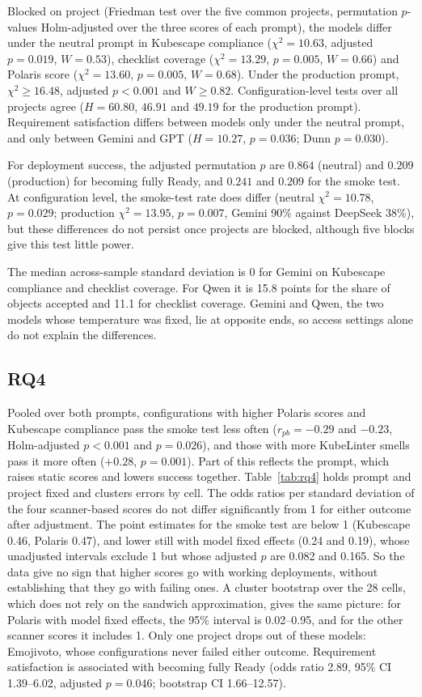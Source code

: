 Blocked on project (Friedman test over the five common projects, permutation $p$-values Holm-adjusted over the three scores of each prompt), the models differ under the neutral prompt in Kubescape compliance ($\chi^2=10.63$, adjusted $p=0.019$, $W=0.53$), checklist coverage ($\chi^2=13.29$, $p=0.005$, $W=0.66$) and Polaris score ($\chi^2=13.60$, $p=0.005$, $W=0.68$). Under the production prompt, $\chi^2\ge16.48$, adjusted $p<0.001$ and $W\ge0.82$. Configuration-level tests over all projects agree ($H=60.80$, $46.91$ and $49.19$ for the production prompt). Requirement satisfaction differs between models only under the neutral prompt, and only between Gemini and GPT ($H=10.27$, $p=0.036$; Dunn $p=0.030$).

For deployment success, the adjusted permutation $p$ are $0.864$ (neutral) and $0.209$ (production) for becoming fully Ready, and $0.241$ and $0.209$ for the smoke test. At configuration level, the smoke-test rate does differ (neutral $\chi^2=10.78$, $p=0.029$; production $\chi^2=13.95$, $p=0.007$, Gemini 90\% against DeepSeek 38\%), but these differences do not persist once projects are blocked, although five blocks give this test little power.

The median across-sample standard deviation is 0 for Gemini on Kubescape compliance and checklist coverage. For Qwen it is 15.8 points for the share of objects accepted and 11.1 for checklist coverage. Gemini and Qwen, the two models whose temperature was fixed, lie at opposite ends, so access settings alone do not explain the differences.

\subsection{RQ4}

Pooled over both prompts, configurations with higher Polaris scores and Kubescape compliance pass the smoke test less often ($r_{pb}=-0.29$ and $-0.23$, Holm-adjusted $p<0.001$ and $p=0.026$), and those with more KubeLinter smells pass it more often ($+0.28$, $p=0.001$). Part of this reflects the prompt, which raises static scores and lowers success together. Table~\ref{tab:rq4} holds prompt and project fixed and clusters errors by cell. The odds ratios per standard deviation of the four scanner-based scores do not differ significantly from 1 for either outcome after adjustment. The point estimates for the smoke test are below 1 (Kubescape 0.46, Polaris 0.47), and lower still with model fixed effects (0.24 and 0.19), whose unadjusted intervals exclude 1 but whose adjusted $p$ are 0.082 and 0.165. So the data give no sign that higher scores go with working deployments, without establishing that they go with failing ones. A cluster bootstrap over the 28 cells, which does not rely on the sandwich approximation, gives the same picture: for Polaris with model fixed effects, the 95\% interval is 0.02--0.95, and for the other scanner scores it includes 1. Only one project drops out of these models: Emojivoto, whose configurations never failed either outcome. Requirement satisfaction is associated with becoming fully Ready (odds ratio 2.89, 95\% CI 1.39--6.02, adjusted $p=0.046$; bootstrap CI 1.66--12.57).

